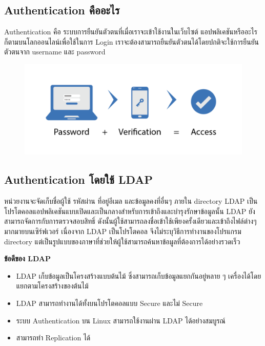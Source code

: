 \subsection{Authentication คืออะไร}
Authentication คือ ระบบการยืนยันตัวตนที่เมื่อเราจะเข้าใช้งานในเว็บไซต์ \mbox{แอปพลิเคชัน}หรืออะไรก็ตามบนโลกออนไลน์เพื่อใช้ในการ Login
เราจะต้องสามารถยืนยันตัวตนได้โดยปกติจะใช้การยืนยันตัวตนจาก username และ password
\begin{figure}[!thb]
	\captionsetup{justification=centering}
	\centering
	\includegraphics[width=6in]{figures/authen.png}
	\label{fig:authen}
\end{figure}
\newpage

\subsection{Authentication โดยใช้ LDAP }
หน่วยงานจะจัดเก็บชื่อผู้ใช้ รหัสผ่าน ที่อยู่อีเมล และข้อมูลคงที่อื่นๆ ภายใน directory LDAP เป็นโปรโตคอลแอปพลิเคชันแบบเปิดและเป็นกลางสำหรับการเข้าถึงและบำรุงรักษาข้อมูลนั้น LDAP ยังสามารถจัดการกับการตรวจสอบสิทธิ์ ดังนั้นผู้ใช้สามารถลงชื่อเข้าใช้เพียงครั้งเดียวและเข้าถึงไฟล์ต่างๆ มากมายบนเซิร์ฟเวอร์ เนื่องจาก LDAP เป็นโปรโตคอล จึงไม่ระบุวิธีการทำงานของโปรแกรม directory แต่เป็นรูปแบบของภาษาที่ช่วยให้ผู้ใช้สามารถค้นหาข้อมูลที่ต้องการได้อย่างรวดเร็ว
\begin{flushleft}
	\textbf{ข้อดีของ LDAP}
\end{flushleft}
\begin{itemize}
    \item LDAP เก็บข้อมูลเป็นโครงสร้างแบบต้นไม้ ซึ่งสามารถเก็บข้อมูลแยกกันอยู่หลาย ๆ เครื่องได้โดยแยกตามโครงสร้างของต้นไม้
    \item LDAP สามารถทำงานได้ทั้งบนโปรโตคอลแบบ Secure และไม่ Secure
    \item ระบบ Authentication บน Linux สามารถใช้งานผ่าน LDAP ได้อย่างสมบูรณ์
    \item สามารถทำ Replication ได้
\end{itemize}



